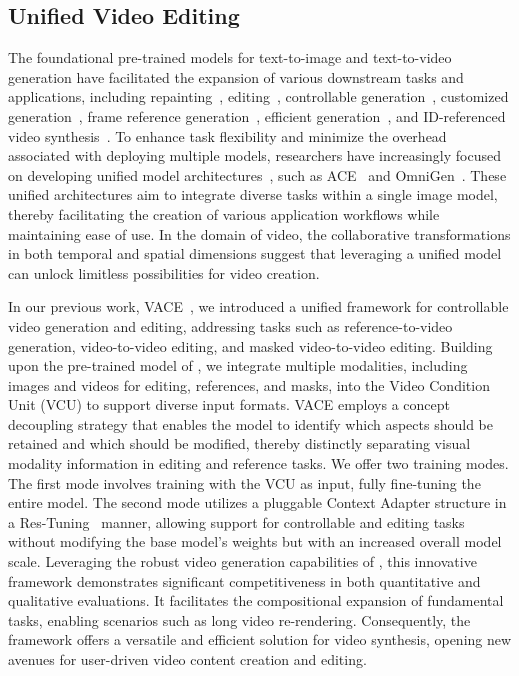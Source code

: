 \subsection{Unified Video Editing}
\label{sec:video_editing}


The foundational pre-trained models for text-to-image and text-to-video generation have facilitated the expansion of various downstream tasks and applications, including repainting~\citep{sdinp, propainter}, editing~\citep{sdedit, ip2p, magicbrush, wang2023videocomposer, dreamVideo2}, controllable generation~\citep{controlnet, scedit, wang2024unianimate}, customized generation~\citep{anydoor, wei2025DreamRelation},
frame reference generation~\citep{cogvideox, i2vadapter}, efficient generation~\citep{wang2023videolcm, yuan2024instructvideo, liu2024timestep}, and ID-referenced video synthesis~\citep{largen, consisid, phantom}. To enhance task flexibility and minimize the overhead associated with deploying multiple models, researchers have increasingly focused on developing unified model architectures~\citep{ominictr, unireal}, such as ACE~\citep{ace, acepp} and OmniGen~\citep{omnigen}. These unified architectures aim to integrate diverse tasks within a single image model, thereby facilitating the creation of various application workflows while maintaining ease of use. In the domain of video, the collaborative transformations in both temporal and spatial dimensions suggest that leveraging a unified model can unlock limitless possibilities for video creation. 

In our previous work, VACE~\citep{vace}, we introduced a unified framework for controllable video generation and editing, addressing tasks such as reference-to-video generation, video-to-video editing, and masked video-to-video editing. Building upon the pre-trained model of \method, we integrate multiple modalities, including images and videos for editing, references, and masks, into the Video Condition Unit (VCU) to support diverse input formats. VACE employs a concept decoupling strategy that enables the model to identify which aspects should be retained and which should be modified, thereby distinctly separating visual modality information in editing and reference tasks. We offer two training modes. The first mode involves training with the VCU as input, fully fine-tuning the entire \method model. The second mode utilizes a pluggable Context Adapter structure in a Res-Tuning~\citep{restuning} manner, allowing support for controllable and editing tasks without modifying the base model's weights but with an increased overall model scale. Leveraging the robust video generation capabilities of \method, this innovative framework demonstrates significant competitiveness in both quantitative and qualitative evaluations. It facilitates the compositional expansion of fundamental tasks, enabling scenarios such as long video re-rendering. Consequently, the framework offers a versatile and efficient solution for video synthesis, opening new avenues for user-driven video content creation and editing.


